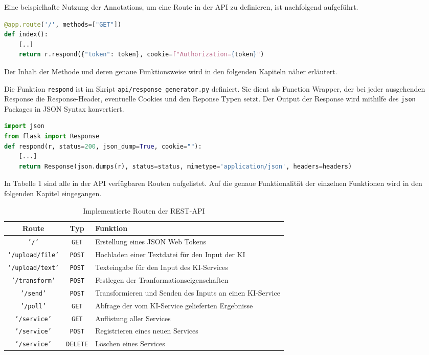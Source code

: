 Eine beispielhafte Nutzung der Annotations, um eine Route in der API zu definieren, ist nachfolgend aufgeführt. 

\begin{lstlisting}[language=Python]
@app.route('/', methods=["GET"])
def index():
    [..]
    return r.respond({"token": token}, cookie=f"Authorization={token}")
\end{lstlisting}

Der Inhalt der Methode und deren genaue Funktionsweise wird in den folgenden Kapiteln näher erläutert.

Die Funktion \texttt{respond} ist im Skript \texttt{api/response\_{}generator.py} definiert. Sie dient als Function Wrapper, der bei jeder ausgehenden Response die Response-Header, eventuelle Cookies und den Reponse Typen setzt. Der Output der Response wird mithilfe des \texttt{json} Packages in JSON Syntax konvertiert.

\begin{lstlisting}[language=Python]
import json
from flask import Response
def respond(r, status=200, json_dump=True, cookie=""):
    [...]
    return Response(json.dumps(r), status=status, mimetype='application/json', headers=headers)
\end{lstlisting}

In Tabelle 1 sind alle in der API verfügbaren Routen aufgelistet. Auf die genaue Funktionalität der einzelnen Funktionen wird in den folgenden Kapitel eingegangen.

\begin{table}[H]
\centering
\begin{tabular}{c|c|l}
\textbf{Route} & \textbf{Typ} & \textbf{Funktion}\\
\hline
\texttt{'/'} & \texttt{GET} & Erstellung eines JSON Web Tokens\\
\hline
\texttt{'/upload/file'}  & \texttt{POST} & Hochladen einer Textdatei für den Input der KI \\
\texttt{'/upload/text'}  & \texttt{POST} & Texteingabe für den Input des KI-Services \\    
\texttt{'/transform'}  & \texttt{POST} & Festlegen der Tranformationseigenschaften\\ 
\texttt{'/send'}  & \texttt{POST} & Transformieren und Senden des Inputs an einen KI-Service \\ 
\texttt{'/poll'}  & \texttt{GET} & Abfrage der vom KI-Service gelieferten Ergebnisse \\ 
\hline
\texttt{'/service'}  & \texttt{GET} & Auflistung aller Services \\
\texttt{'/service'}  & \texttt{POST} & Registrieren eines neuen Services \\ 
\texttt{'/service'}  & \texttt{DELETE} & Löschen eines Services \\       
\end{tabular}
\caption{Implementierte Routen der REST-API}
\end{table}

